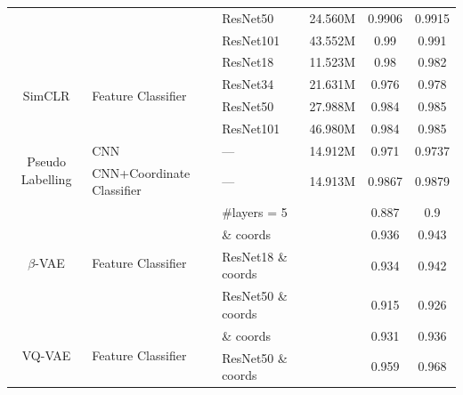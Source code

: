 \documentclass{article}
\begin{document}
\begin{table}[!htp]
\begin{tabular}{cllccc}
                                      &                                                  & ResNet50                    & 24.560M           & 0.9906            & 0.9915            \\
                                      &                                                  & ResNet101                   & 43.552M           & 0.99              & 0.991             \\ \cmidrule{1-6}
    \multirow{4}{*}{SimCLR}           & \multirow{4}{*}{Feature Classifier}              & ResNet18                    & 11.523M           & 0.98              & 0.982             \\
                                      &                                                  & ResNet34                    & 21.631M           & 0.976             & 0.978             \\
                                      &                                                  & ResNet50                    & 27.988M           & 0.984             & 0.985             \\
                                      &                                                  & ResNet101                   & 46.980M           & 0.984             & 0.985             \\ \cmidrule{1-6}
    \multirow{2}{*}{Pseudo Labelling} & CNN                                              & ---                         & 14.912M           & 0.971             & 0.9737            \\
                                      & CNN+Coordinate Classifier                        & ---                         & 14.913M           & 0.9867            & 0.9879            \\\cmidrule{1-6}
    \multirow{4}{*}{$\beta$-VAE}      & \multirow{4}{*}{Feature Classifier}              & \#layers = 5                &                   & 0.887             & 0.9               \\
                                      &                                                  & \& coords                   &                   & 0.936             & 0.943             \\
                                      &                                                  & ResNet18          \& coords &                   & 0.934             & 0.942             \\
                                      &                                                  & ResNet50          \& coords &                   & 0.915             & 0.926             \\ \cmidrule{1-6}
    \multirow{2}{*}{VQ-VAE}           & \multirow{2}{*}{Feature Classifier}              & \& coords                   &                   & 0.931             & 0.936             \\
                                      &                                                  & ResNet50          \& coords &                   & 0.959             & 0.968             \\ \midrule
    \bottomrule
  \end{tabular}
\end{table}
\end{document}
